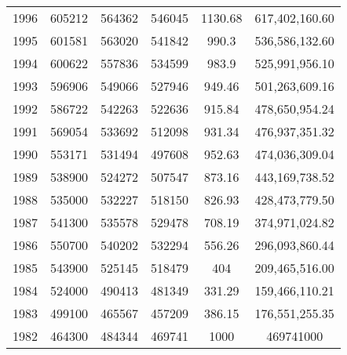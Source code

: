 \begin{tabular}{S S S S S[round-mode = places, round-precision = 0] S[fixed-exponent = 6, table-omit-exponent,table-format = 3.0, table-auto-round]}
1996 & 605212 & 564362 & 546045 & 1130.68 &  617,402,160.60 \\ 
1995 & 601581 & 563020 & 541842 & 990.3 &  536,586,132.60 \\ 
1994 & 600622 & 557836 & 534599 & 983.9 &  525,991,956.10 \\ 
1993 & 596906 & 549066 & 527946 & 949.46 &  501,263,609.16 \\ 
1992 & 586722 & 542263 & 522636 & 915.84 &  478,650,954.24 \\ 
1991 & 569054 & 533692 & 512098 & 931.34 &  476,937,351.32 \\ 
1990 & 553171 & 531494 & 497608 & 952.63 &  474,036,309.04 \\ 
1989 & 538900 & 524272 & 507547 & 873.16 &  443,169,738.52 \\ 
1988 & 535000 & 532227 & 518150 & 826.93 &  428,473,779.50 \\ 
1987 & 541300 & 535578 & 529478 & 708.19 &  374,971,024.82 \\ 
1986 & 550700 & 540202 & 532294 & 556.26 &  296,093,860.44 \\ 
1985 & 543900 & 525145 & 518479 & 404 &  209,465,516.00 \\ 
1984 & 524000 & 490413 & 481349 & 331.29 &  159,466,110.21 \\ 
1983 & 499100 & 465567 & 457209 & 386.15 &  176,551,255.35 \\ 
1982 & 464300 & 484344 & 469741 & 1000 & 469741000



\end{tabular}
